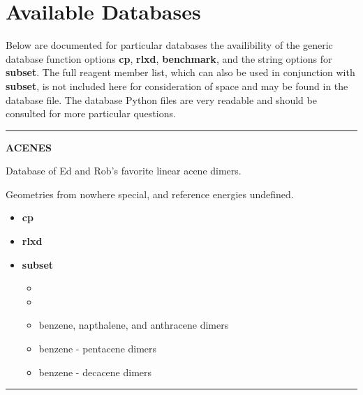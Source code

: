\documentclass[letterpaper,10pt,english]{sphinxmanual}
\begin{document}
\section{Available Databases}
\label{index:available-databases}
Below are documented for particular databases the availibility of the generic
database function options \textbf{cp}, \textbf{rlxd}, \textbf{benchmark}, and the string
options for \textbf{subset}. The full reagent member list, which can also be used
in conjunction with \textbf{subset}, is not included here for consideration of space
and may be found in the database file. The database Python files are very
readable and should be consulted for more particular questions.


\bigskip\hrule{}\bigskip

\label{index:module-ACENES}
\textbf{ACENES}

\begin{DUlineblock}{0em}
\item[] Database of Ed and Rob's favorite linear acene dimers.
\item[] Geometries from nowhere special, and reference energies undefined.
\end{DUlineblock}
\begin{itemize}
\item {} 
\textbf{cp}   \textbar{}\textbar{} 

\item {} 
\textbf{rlxd} 

\item {} 
\textbf{subset}
\begin{itemize}
\item {} 

\item {} 

\item {} 
 benzene, napthalene, and anthracene dimers

\item {} 
 benzene - pentacene dimers

\item {} 
 benzene - decacene dimers

\end{itemize}

\end{itemize}


\bigskip\hrule{}\bigskip
\end{document}
